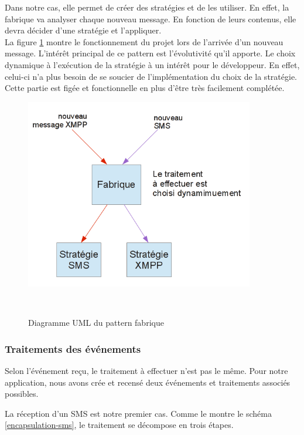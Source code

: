 Dans notre cas, elle permet de créer des stratégies et de les utiliser. En effet, la fabrique 
va analyser chaque nouveau message. En fonction de leurs contenus, elle devra décider d'une stratégie
et l'appliquer.
\\
 
La figure \ref{fonctionnement-strategie-factorie} montre le fonctionnement du projet lors de l'arrivée d'un
nouveau message. L'intérêt principal de ce pattern est l'évolutivité qu'il apporte. Le choix dynamique à
l'exécution de la stratégie à un intérêt pour le développeur. En effet, celui-ci n'a plus besoin de se
soucier de l'implémentation du choix de la stratégie. Cette partie est figée et fonctionnelle en plus d'être très facilement complétée.
 
\begin{figure}[H]
  \center
  \includegraphics[width=10cm]{img/fonctionnement-strategie-factorie.png}
  \caption{Diagramme UML du pattern fabrique}
  \label{fonctionnement-strategie-factorie}
~~\\
\end{figure}
 
 
\subsubsection{Traitements des événements}
 
Selon l’événement reçu, le traitement à effectuer n'est pas le même. Pour notre application, nous avons 
crée et recensé deux événements et traitements associés possibles.
 
La réception d'un SMS est notre premier cas. Comme le montre le schéma \ref{encapsulation-sms}, le traitement se 
décompose en trois étapes. 
 
